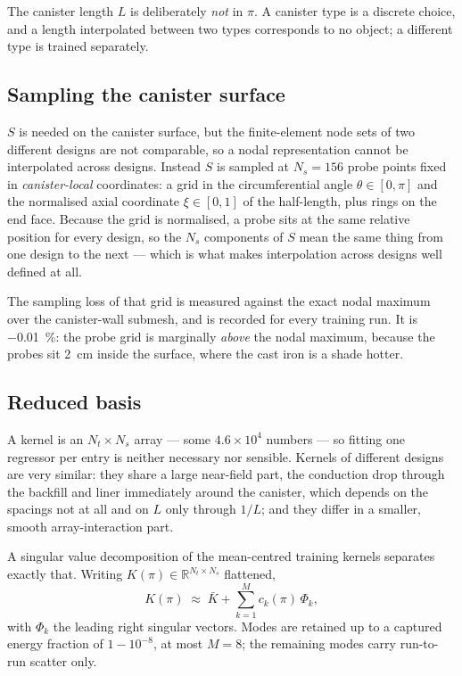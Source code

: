 \documentclass[11pt,a4paper]{article}
\theoremstyle{plain}
\begin{document}
The canister length $L$ is deliberately \emph{not} in $\pi$. A canister type is
a discrete choice, and a length interpolated between two types corresponds to
no object; a different type is trained separately.

\subsection{Sampling the canister surface}

$S$ is needed on the canister surface, but the finite-element node sets of two
different designs are not comparable, so a nodal representation cannot be
interpolated across designs. Instead $S$ is sampled at $N_s = 156$ probe points
fixed in \emph{canister-local} coordinates: a grid in the circumferential angle
$\theta \in [0, \pi]$ and the normalised axial coordinate $\xi \in [0, 1]$ of
the half-length, plus rings on the end face. Because the grid is normalised, a
probe sits at the same relative position for every design, so the $N_s$
components of $S$ mean the same thing from one design to the next --- which is
what makes interpolation across designs well defined at all.

The sampling loss of that grid is measured against the exact nodal maximum over
the canister-wall submesh, and is recorded for every training run. It is
\SI{-0.01}{\percent}: the probe grid is marginally \emph{above} the nodal
maximum, because the probes sit \SI{2}{\centi\metre} inside the surface, where
the cast iron is a shade hotter.

\subsection{Reduced basis}

A kernel is an $N_t \times N_s$ array --- some $4.6 \times 10^4$ numbers --- so
fitting one regressor per entry is neither necessary nor sensible. Kernels of
different designs are very similar: they share a large near-field part, the
conduction drop through the backfill and liner immediately around the canister,
which depends on the spacings not at all and on $L$ only through $1/L$; and they
differ in a smaller, smooth array-interaction part.

A singular value decomposition of the mean-centred training kernels separates
exactly that. Writing $K(\pi) \in \mathbb{R}^{N_t \times N_s}$ flattened,
\begin{equation}
  K(\pi) \;\approx\; \bar K + \sum_{k=1}^{M} c_k(\pi)\, \Phi_k,
  \label{eq:pod}
\end{equation}
with $\Phi_k$ the leading right singular vectors. Modes are retained up to a
captured energy fraction of $1 - 10^{-8}$, at most $M = 8$; the remaining
modes carry run-to-run scatter only.
\end{document}
